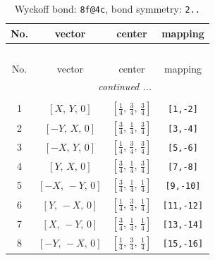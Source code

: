 \documentclass[fleqn,8pt]{jsarticle}
\begin{document}
\begin{longtable}{cccc}
\caption{Wyckoff bond: {\tt 8f@4c}, bond symmetry: {\tt 2..}}
 \\
 \hline \hline
No. & vector & center & mapping \\ \hline \endfirsthead

\multicolumn{3}{l}{\tablename\ \thetable{}} \\
 \hline \hline
No. & vector & center & mapping \\ \hline \endhead

 \hline \hline
\multicolumn{3}{r}{\footnotesize\it continued ...} \\ \endfoot

 \hline \hline
\multicolumn{3}{r}{} \\ \endlastfoot

1 & $\left[ X,\, Y,\, 0 \right]$ & $\left[ \frac{1}{4},\, \frac{3}{4},\, \frac{3}{4} \right]$ & {\tt [1,-2]} \\ \hline
2 & $\left[ - Y,\, X,\, 0 \right]$ & $\left[ \frac{3}{4},\, \frac{1}{4},\, \frac{3}{4} \right]$ & {\tt [3,-4]} \\ \hline
3 & $\left[ - X,\, Y,\, 0 \right]$ & $\left[ \frac{1}{4},\, \frac{3}{4},\, \frac{3}{4} \right]$ & {\tt [5,-6]} \\ \hline
4 & $\left[ Y,\, X,\, 0 \right]$ & $\left[ \frac{3}{4},\, \frac{1}{4},\, \frac{3}{4} \right]$ & {\tt [7,-8]} \\ \hline
5 & $\left[ - X,\, - Y,\, 0 \right]$ & $\left[ \frac{3}{4},\, \frac{1}{4},\, \frac{1}{4} \right]$ & {\tt [9,-10]} \\ \hline
6 & $\left[ Y,\, - X,\, 0 \right]$ & $\left[ \frac{1}{4},\, \frac{3}{4},\, \frac{1}{4} \right]$ & {\tt [11,-12]} \\ \hline
7 & $\left[ X,\, - Y,\, 0 \right]$ & $\left[ \frac{3}{4},\, \frac{1}{4},\, \frac{1}{4} \right]$ & {\tt [13,-14]} \\ \hline
8 & $\left[ - Y,\, - X,\, 0 \right]$ & $\left[ \frac{1}{4},\, \frac{3}{4},\, \frac{1}{4} \right]$ & {\tt [15,-16]} \\
\end{longtable}
\renewcommand{\arraystretch}{1.2}
\end{document}

